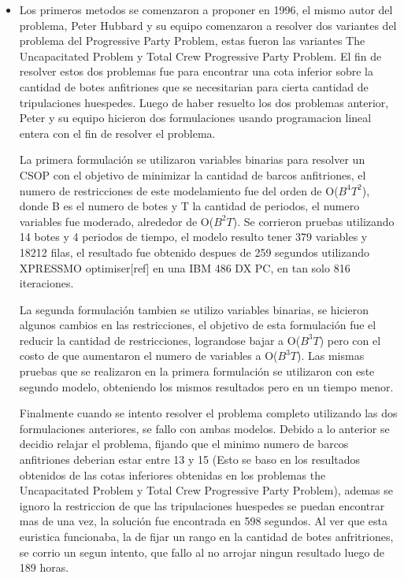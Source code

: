 \documentclass[spanish, fleqn]{article}
\begin{document}
\begin{itemize}
\item Los primeros metodos se comenzaron a proponer en 1996, el mismo autor del problema, Peter Hubbard y su equipo comenzaron a resolver dos variantes del problema del Progressive Party Problem, estas fueron las variantes The Uncapacitated Problem y  Total Crew Progressive Party Problem. El fin de resolver estos dos problemas fue para encontrar una cota inferior sobre la cantidad de botes anfitriones que se necesitarian para cierta cantidad de tripulaciones huespedes.
Luego de haber resuelto los dos problemas anterior, Peter y su equipo hicieron dos formulaciones usando programacion lineal entera con el fin de resolver el problema. 

La primera formulación se utilizaron variables binarias para resolver un CSOP con el objetivo de minimizar la cantidad de barcos anfitriones, el numero de restricciones de este modelamiento fue del orden de O($B^{4}T^{2}$), donde B es el numero de botes y T la cantidad de periodos, el numero variables fue moderado, alrededor de O($B^{2}T$). Se corrieron pruebas utilizando 14 botes y 4 periodos de tiempo, el modelo resulto tener 379 variables y 18212 filas, el resultado fue obtenido despues de 259 segundos utilizando XPRESSMO optimiser[ref] en una IBM 486 DX PC, en tan solo 816 iteraciones.

La segunda formulación tambien se utilizo variables binarias, se hicieron algunos cambios en las restricciones, el objetivo de esta formulación fue el reducir la cantidad de restricciones, lograndose bajar a O($B^{3}T$) pero con el costo de que aumentaron el numero de variables a O($B^{3}T$). Las mismas pruebas que se realizaron en la primera formulación se utilizaron con este segundo modelo, obteniendo los mismos resultados pero en un tiempo menor.

Finalmente cuando se intento resolver el problema completo utilizando las dos formulaciones anteriores, se fallo con ambas modelos. Debido a lo anterior se decidio relajar el problema, fijando que el minimo numero de barcos anfitriones deberian estar entre 13 y 15 (Esto se baso en los resultados obtenidos de las cotas inferiores obtenidas en los problemas the Uncapacitated Problem y  Total Crew Progressive Party Problem), ademas se ignoro la restriccion de que las tripulaciones huespedes se puedan encontrar mas de una vez, la solución fue encontrada en 598 segundos. Al ver que esta euristica funcionaba, la de fijar un rango en la cantidad de botes anfritriones, se corrio un segun intento, que fallo al no arrojar ningun resultado luego de 189 horas.


\end{itemize}
\end{document}
